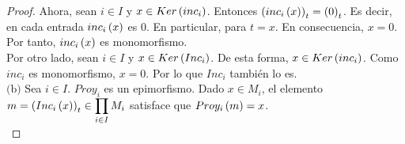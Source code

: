 \documentclass{article}
\begin{document}
\begin{enumerate}[label=\textbf{Ej \arabic*.}]
\begin{proof}
			Ahora, sean $i \in I$ y $x \in Ker\left(inc_{i}\right)$. Entonces $\left(inc_{i}\left(x\right)\right)_{t}=\left(0\right)_{t}$. Es decir, en cada entrada $inc_{i}\left(x\right)$ es $0$. En particular, para $t=x$. En consecuencia, $x=0$. Por tanto, $inc_{i}\left(x\right)$ es monomorfismo.\\
		
			Por otro lado, sean $i \in I$ y $x \in Ker\left(Inc_{i}\right)$. De esta forma, $x \in Ker\left(inc_{i}\right)$. Como $inc_{i}$ es monomorfismo, $x=0$. Por lo que $Inc_{i}$ también lo es.\\
		
			$\boxed{\text{(b)}}$ Sea $i \in I$. $Proy_{i}$ es un epimorfismo. Dado $x \in M_{i}$, el elemento $m=\left(Inc_{i}\left(x\right)\right)_{t}\in\displaystyle\prod_{i \in I} M_{i}$ satisface que $Proy_{i}\left(m\right)=x$.\\
		

\end{proof}
\end{enumerate}
\end{document}
